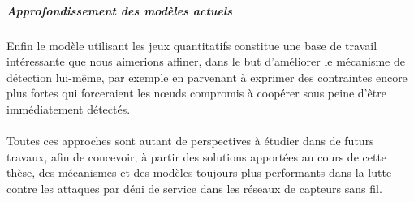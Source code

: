         \vspace{-1em}
        \subparagraph{Approfondissement des modèles actuels}
Enfin le modèle utilisant les jeux quantitatifs constitue une base de travail intéressante que nous aimerions affiner, dans le but d'améliorer le mécanisme de détection lui-même, par exemple en parvenant à exprimer des contraintes encore plus fortes qui forceraient les nœuds compromis à coopérer sous peine d'être immédiatement détectés.

    \vspace{1em}
    \paragraph{}
Toutes ces approches sont autant de perspectives à étudier dans de futurs travaux, afin de concevoir, à partir des solutions apportées au cours de cette thèse, des mécanismes et des modèles toujours plus performants dans la lutte contre les attaques par déni de service dans les réseaux de capteurs sans fil.
\pagebreak
